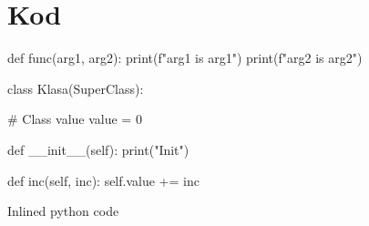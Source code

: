 \chapter{Kod}

\begin{python}
def func(arg1, arg2):
  print(f"arg1 is {arg1}")
  print(f"arg2 is {arg2}")

class Klasa(SuperClass):
  
  # Class value
  value = 0

  def __init__(self):
    print("Init")

  def inc(self, inc):
    self.value += inc
\end{python}

Inlined python code 